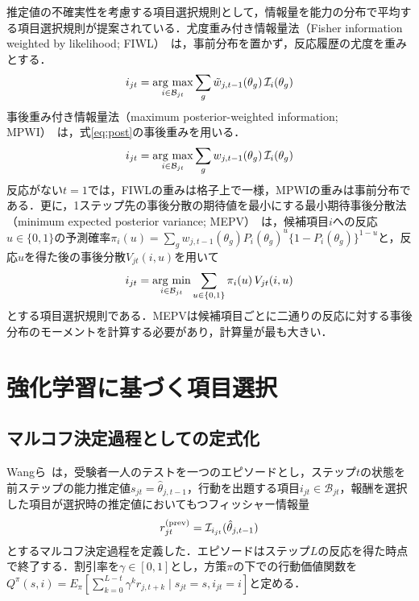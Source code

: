\documentclass[a4paper,12pt,oneside,openany]{jsbook}
\begin{document}
推定値の不確実性を考慮する項目選択規則として，情報量を能力の分布で平均する項目選択規則が提案されている．尤度重み付き情報量法（Fisher information weighted by likelihood; FIWL）~\cite{VeerkampBerger1997}は，事前分布を置かず，反応履歴の尤度を重みとする．
\begin{equation}
 i_{jt}=\mathop{\rm arg~max}_{i\in\mathcal{B}_{jt}}\sum_{g}\tilde w_{j,t-1}(\theta_g)\,\mathcal{I}_i(\theta_g)
 \label{eq:fiwl}
\end{equation}
事後重み付き情報量法（maximum posterior-weighted information; MPWI）~\cite{vanderLinden1998}は，式\eqref{eq:post}の事後重みを用いる．
\begin{equation}
 i_{jt}=\mathop{\rm arg~max}_{i\in\mathcal{B}_{jt}}\sum_{g}w_{j,t-1}(\theta_g)\,\mathcal{I}_i(\theta_g)
 \label{eq:mpwi}
\end{equation}
反応がない$t=1$では，FIWLの重みは格子上で一様，MPWIの重みは事前分布である．更に，1ステップ先の事後分散の期待値を最小にする最小期待事後分散法（minimum expected posterior variance; MEPV）~\cite{Owen1975,vanderLinden1998}は，候補項目$i$への反応$u\in\{0,1\}$の予測確率$\pi_{i}(u)=\sum_gw_{j,t-1}(\theta_g)P_i(\theta_g)^u\{1-P_i(\theta_g)\}^{1-u}$と，反応$u$を得た後の事後分散$V_{jt}(i,u)$を用いて
\begin{equation}
 i_{jt}=\mathop{\rm arg~min}_{i\in\mathcal{B}_{jt}}\sum_{u\in\{0,1\}}\pi_i(u)\,V_{jt}(i,u)
 \label{eq:mepv}
\end{equation}
とする項目選択規則である．MEPVは候補項目ごとに二通りの反応に対する事後分布のモーメントを計算する必要があり，計算量が最も大きい．

\chapter{強化学習に基づく項目選択}\label{sec:rl}

\section{マルコフ決定過程としての定式化}\label{sec:mdp}

Wangら~\cite{WangLiuXu2024}は，受験者一人のテストを一つのエピソードとし，ステップ$t$の状態を前ステップの能力推定値$s_{jt}=\hat\theta_{j,t-1}$，行動を出題する項目$i_{jt}\in\mathcal{B}_{jt}$，報酬を選択した項目が選択時の推定値においてもつフィッシャー情報量
\begin{equation}
 r^{\rm (prev)}_{jt}=\mathcal{I}_{i_{jt}}(\hat\theta_{j,t-1})
 \label{eq:reward-prev}
\end{equation}
とするマルコフ決定過程を定義した．エピソードはステップ$L$の反応を得た時点で終了する．割引率を$\gamma\in[0,1]$とし，方策$\pi$の下での行動価値関数を$Q^\pi(s,i)=E_\pi[\sum_{k=0}^{L-t}\gamma^kr_{j,t+k}\mid s_{jt}=s,i_{jt}=i]$と定める．
\end{document}
